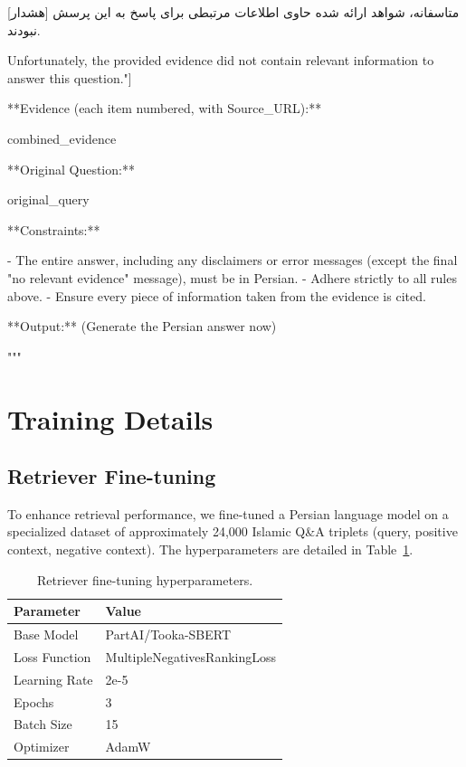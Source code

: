 \documentclass[11pt]{article}
\newcommand{\fa}[1]{\textfarsi{#1}}
\begin{document}
\fa{[هشدار] متاسفانه، شواهد ارائه شده حاوی اطلاعات مرتبطی برای پاسخ به این پرسش نبودند.}

\begin{PromptBlock}
[Translate: "[Warning] Unfortunately, the provided evidence did not contain relevant information to answer this question."]

**Evidence (each item numbered, with Source_URL):**

{combined_evidence}

**Original Question:**

{original_query}

**Constraints:**

- The entire answer, including any disclaimers or error messages (except the final "no relevant evidence" message), must be in Persian.
- Adhere strictly to all rules above.
- Ensure every piece of information taken from the evidence is cited.

**Output:** (Generate the Persian answer now)

"""
\end{PromptBlock}

\section{Training Details}
\label{sec:appendix-training}

\subsection{Retriever Fine-tuning}

To enhance retrieval performance, we fine-tuned a Persian language model on a specialized dataset of approximately 24,000 Islamic Q\&A triplets (query, positive context, negative context). The hyperparameters are detailed in Table~\ref{tab:retriever-hyperparams}.

\begin{table}[t]
\centering
\small
\begin{tabular}{ll}
\hline
\textbf{Parameter} & \textbf{Value} \\
\hline
Base Model & PartAI/Tooka-SBERT \\
Loss Function & MultipleNegativesRankingLoss \\
Learning Rate & 2e-5 \\
Epochs & 3 \\
Batch Size & 15 \\
Optimizer & AdamW \\
\hline
\end{tabular}
\caption{Retriever fine-tuning hyperparameters.}
\label{tab:retriever-hyperparams}
\end{table}
\end{document}
